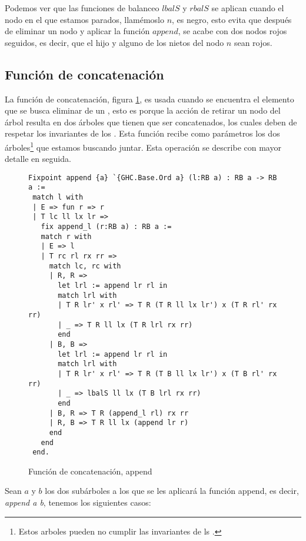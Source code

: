 Podemos ver que las funciones de balanceo $lbalS$ y $rbalS$ se aplican cuando el nodo en el que
estamos parados, llamémoslo $n$, es negro, esto evita que después de eliminar un nodo y aplicar la
funci\'on $append$, se acabe con dos nodos rojos seguidos, es decir, que el hijo y alguno de los
nietos del nodo $n$ sean rojos.

\subsection{Funci\'on de concatenaci\'on}

La funci\'on de concatenación, figura \ref{func_app}, es usada cuando se encuentra el elemento que
se busca eliminar de un {\arn}, esto es porque la acci\'on de retirar un nodo del \'arbol resulta
en dos \'arboles que tienen que ser concatenados, los cuales deben de respetar los invariantes de
los {\arns}. Esta funci\'on recibe como parámetros los dos \'arboles\footnote{Estos arboles pueden
no cumplir las invariantes de ls {\arns}.} que estamos buscando juntar. Esta operación se describe
con mayor detalle en seguida.

\begin{figure}
\centering
\captionsetup{justification=centering}
\begin{verbatim}
Fixpoint append {a} `{GHC.Base.Ord a} (l:RB a) : RB a -> RB a :=
 match l with
 | E => fun r => r
 | T lc ll lx lr =>
   fix append_l (r:RB a) : RB a :=
   match r with
   | E => l
   | T rc rl rx rr =>
     match lc, rc with
     | R, R =>
       let lrl := append lr rl in
       match lrl with
       | T R lr' x rl' => T R (T R ll lx lr') x (T R rl' rx rr)
       | _ => T R ll lx (T R lrl rx rr)
       end
     | B, B =>
       let lrl := append lr rl in
       match lrl with
       | T R lr' x rl' => T R (T B ll lx lr') x (T B rl' rx rr)
       | _ => lbalS ll lx (T B lrl rx rr)
       end
     | B, R => T R (append_l rl) rx rr
     | R, B => T R ll lx (append lr r)
     end
   end
 end.
\end{verbatim}
\caption{Funci\'on de concatenaci\'on, append}
\label{func_app}
\end{figure}


Sean $a$ y $b$ los dos subárboles a los que se les aplicar\'a la funci\'on append, es decir,
\textit{append a b}, tenemos los siguientes casos:

